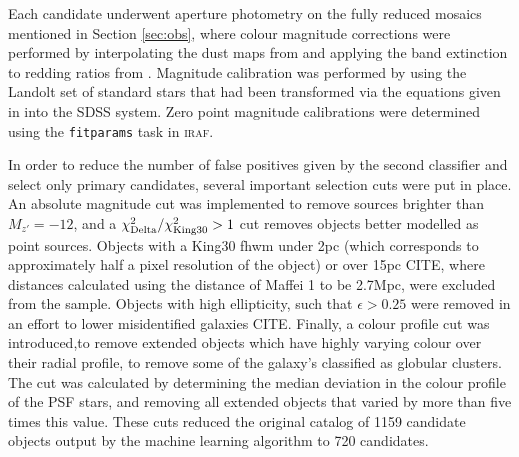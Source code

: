 \documentclass[useAMS,usenatbib]{mn2e}
\begin{document}
Each candidate underwent aperture photometry on the fully reduced mosaics mentioned in Section \ref{sec:obs}, where colour magnitude corrections were performed by interpolating the dust maps from \citet{Schlegel1998} and applying the band extinction to redding ratios from \citet{Schlafly2011}. Magnitude calibration was performed by using the Landolt set of standard stars \citep{Landolt1992} that had been transformed via the equations given in \citet{Fukugita1996} into the SDSS system. Zero point magnitude calibrations were determined using the \verb|fitparams| task in \textsc{iraf}.




In order to reduce the number of false positives given by the second classifier and select only primary candidates, several important selection cuts were put in place. An absolute magnitude cut was implemented to remove sources brighter than $M_{z'} = -12$, and a $\chi^2_{\rm{Delta}}/\chi^2_{\rm{King30}} >1$ cut removes objects better modelled as point sources. Objects with a King30 fhwm under 2pc (which corresponds to approximately half a pixel resolution of the object) or over 15pc  {\color{red} CITE}, where distances calculated using the distance of Maffei 1 to be 2.7Mpc, were excluded from the sample. Objects with high ellipticity, such that $\epsilon > 0.25$ were removed in an effort to lower misidentified galaxies {\color{red} CITE}. Finally, a colour profile cut was introduced,to remove extended objects which have highly varying colour over their radial profile, to remove some of the galaxy's classified as globular clusters. The cut was calculated by determining the median deviation in the colour profile of the PSF stars, and removing all extended objects that varied by more than five times this value. These cuts reduced the original catalog of 1159 candidate objects output by the machine learning algorithm to 720 candidates.
\end{document}
